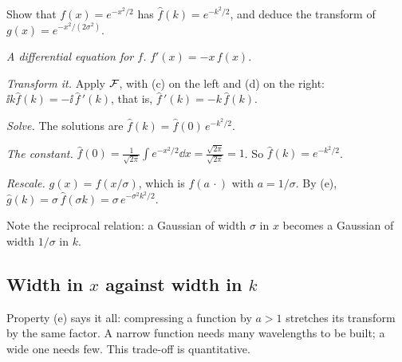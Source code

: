 \begin{example}\label{ex:gaussian-ft}
  Show that $f(x)=e^{-x^2/2}$ has $\hat f(k)=e^{-k^2/2}$, and deduce the transform of $g(x)=e^{-x^2/(2\sigma^2)}$.
\end{example}
\begin{solution}
  \begin{steps}
    \item \emph{A differential equation for $f$.} $f'(x)=-x\,f(x)$.
    \item \emph{Transform it.} Apply $\mathcal{F}$, with (c) on the left and (d) on the right: $\ii k\hat f(k)=-\ii\,\hat f\,'(k)$, that is, $\hat f\,'(k)=-k\,\hat f(k)$.
    \item \emph{Solve.} The solutions are $\hat f(k)=\hat f(0)\,e^{-k^2/2}$.
    \item \emph{The constant.} $\hat f(0)=\frac1{\sqrt{2\pi}}\int e^{-x^2/2}\dd x=\frac{\sqrt{2\pi}}{\sqrt{2\pi}}=1$. So $\hat f(k)=e^{-k^2/2}$.
    \item \emph{Rescale.} $g(x)=f(x/\sigma)$, which is $f(a\,\cdot)$ with $a=1/\sigma$. By (e), $\hat g(k)=\sigma\,\hat f(\sigma k)=\sigma\,e^{-\sigma^2k^2/2}$.
  \end{steps}
  Note the reciprocal relation: a Gaussian of width $\sigma$ in $x$ becomes a Gaussian of width $1/\sigma$ in $k$.
\end{solution}

\subsection{Width in $x$ against width in $k$}

Property (e) says it all: compressing a function by $a>1$ stretches its transform by the same factor. A narrow function needs many wavelengths to be built; a wide one needs few. This trade-off is quantitative.

